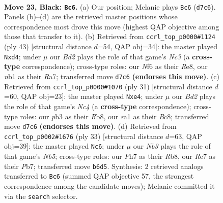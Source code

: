 \documentclass[11pt]{article}
\begin{document}
\clearpage

\begin{figure}[p]\centering
\begin{subfigure}{0.46\textwidth}\centering
\resizebox{\linewidth}{!}{%
\newchessgame
\chessboard[
  setfen={5rk1/3brppp/1n2pn2/p1N5/6P1/1P2P3/P3BRPP/RN4K1 b - - 0 23},
  showmover=false,
  pgfstyle=straightmove, color=movearrow, markmove={d7-c6}
]}
\caption{}
\end{subfigure}\hfill
\begin{subfigure}{0.46\textwidth}\centering
\resizebox{\linewidth}{!}{%
\newchessgame
\chessboard[
  setfen={4r1k1/rp2bppp/2n1p3/p1n5/2PN1B2/8/PP3PPP/1R1R1BK1 b - - 1 22},
  showmover=false,
  pgfstyle=straightmove, color=movearrow, markmove={c6-d4}
]}
\caption{}
\end{subfigure}
\\[4pt]
\begin{subfigure}{0.46\textwidth}\centering
\resizebox{\linewidth}{!}{%
\newchessgame
\chessboard[
  setfen={1rb2rk1/3p1ppp/1p2p3/p1n5/2P1N3/2R3P1/PP2PPBP/3R2K1 b - - 1 16},
  showmover=false,
  pgfstyle=straightmove, color=movearrow, markmove={c5-e4}
]}
\caption{}
\end{subfigure}\hfill
\begin{subfigure}{0.46\textwidth}\centering
\resizebox{\linewidth}{!}{%
\newchessgame
\chessboard[
  setfen={1r5r/1p1bkppp/p3pn2/P3N3/Nn6/4P3/1P3PPP/R2R1BK1 b - - 1 17},
  showmover=false,
  pgfstyle=straightmove, color=movearrow, markmove={b4-c6}
]}
\caption{}
\end{subfigure}
\caption{\textbf{Move 23, Black: \texttt{Bc6}.} (a) Our position; Melanie plays \texttt{Bc6} (\texttt{d7c6}). Panels (b)--(d) are the retrieved master positions whose correspondence most drove this move (highest QAP objective among those that transfer to it). (b) Retrieved from \texttt{ccrl\_top\_p0000\#1124} (ply 43) [structural distance $d$=54, QAP obj=34]: the master played \texttt{Nxd4}; under $\mu$ our \emph{Bd2} plays the role of that game's \emph{Nc3} (a \textbf{cross-type} correspondence); cross-type roles: our \emph{N}f6 as their \emph{R}e8, our \emph{n}b1 as their \emph{R}a7; transferred move \texttt{d7c6} \textbf{(endorses this move)}. (c) Retrieved from \texttt{ccrl\_top\_p0000\#1070} (ply 31) [structural distance $d$=60, QAP obj=23]: the master played \texttt{Nxe4}; under $\mu$ our \emph{Bd2} plays the role of that game's \emph{Nc4} (a \textbf{cross-type} correspondence); cross-type roles: our \emph{p}b3 as their \emph{R}b8, our \emph{r}a1 as their \emph{B}c8; transferred move \texttt{d7c6} \textbf{(endorses this move)}. (d) Retrieved from \texttt{ccrl\_top\_p0002\#1676} (ply 33) [structural distance $d$=63, QAP obj=39]: the master played \texttt{Nc6}; under $\mu$ our \emph{Nb3} plays the role of that game's \emph{Nb5}; cross-type roles: our \emph{P}h7 as their \emph{R}b8, our \emph{R}e7 as their \emph{P}b7; transferred move \texttt{b6d5}. Synthesis: 2 retrieved analogs transferred to \texttt{Bc6} (summed QAP objective 57, the strongest correspondence among the candidate moves); Melanie committed it via the \texttt{search} selector.}
\label{fig:thought-m45}
\end{figure}
\end{document}
